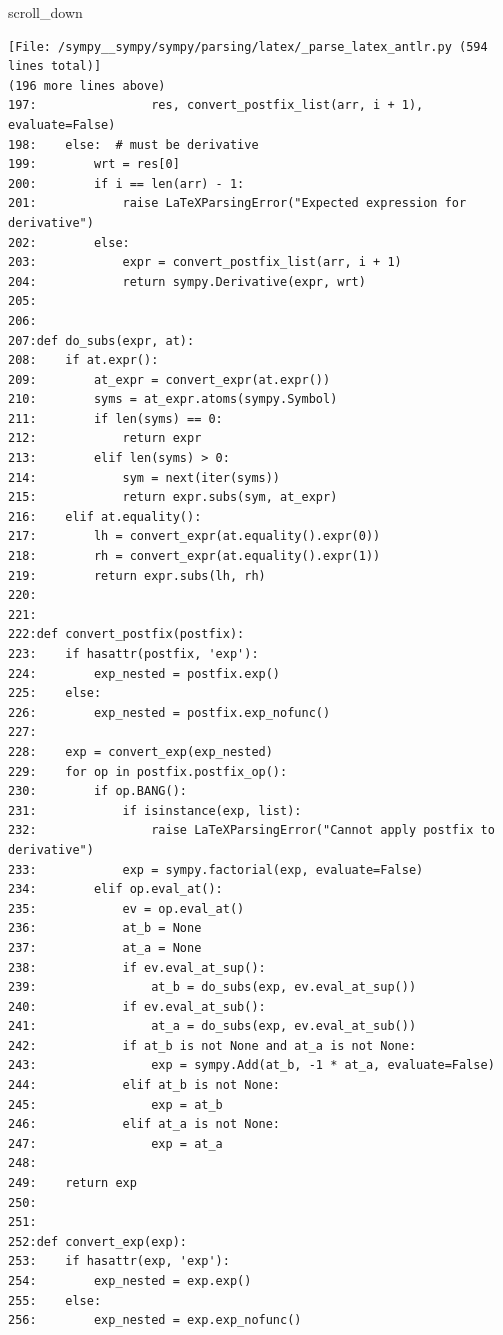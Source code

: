 {\begin{agentbox}
\hrulefill
\begin{CodeVerbatim}[breaklines=true, breakanywhere=true]
scroll_down
\end{CodeVerbatim}
\end{agentbox}
\begin{observationbox}\begin{Verbatim}[breaklines=true, breakanywhere=true]
[File: /sympy__sympy/sympy/parsing/latex/_parse_latex_antlr.py (594 lines total)]
(196 more lines above)
197:                res, convert_postfix_list(arr, i + 1), evaluate=False)
198:    else:  # must be derivative
199:        wrt = res[0]
200:        if i == len(arr) - 1:
201:            raise LaTeXParsingError("Expected expression for derivative")
202:        else:
203:            expr = convert_postfix_list(arr, i + 1)
204:            return sympy.Derivative(expr, wrt)
205:
206:
207:def do_subs(expr, at):
208:    if at.expr():
209:        at_expr = convert_expr(at.expr())
210:        syms = at_expr.atoms(sympy.Symbol)
211:        if len(syms) == 0:
212:            return expr
213:        elif len(syms) > 0:
214:            sym = next(iter(syms))
215:            return expr.subs(sym, at_expr)
216:    elif at.equality():
217:        lh = convert_expr(at.equality().expr(0))
218:        rh = convert_expr(at.equality().expr(1))
219:        return expr.subs(lh, rh)
220:
221:
222:def convert_postfix(postfix):
223:    if hasattr(postfix, 'exp'):
224:        exp_nested = postfix.exp()
225:    else:
226:        exp_nested = postfix.exp_nofunc()
227:
228:    exp = convert_exp(exp_nested)
229:    for op in postfix.postfix_op():
230:        if op.BANG():
231:            if isinstance(exp, list):
232:                raise LaTeXParsingError("Cannot apply postfix to derivative")
233:            exp = sympy.factorial(exp, evaluate=False)
234:        elif op.eval_at():
235:            ev = op.eval_at()
236:            at_b = None
237:            at_a = None
238:            if ev.eval_at_sup():
239:                at_b = do_subs(exp, ev.eval_at_sup())
240:            if ev.eval_at_sub():
241:                at_a = do_subs(exp, ev.eval_at_sub())
242:            if at_b is not None and at_a is not None:
243:                exp = sympy.Add(at_b, -1 * at_a, evaluate=False)
244:            elif at_b is not None:
245:                exp = at_b
246:            elif at_a is not None:
247:                exp = at_a
248:
249:    return exp
250:
251:
252:def convert_exp(exp):
253:    if hasattr(exp, 'exp'):
254:        exp_nested = exp.exp()
255:    else:
256:        exp_nested = exp.exp_nofunc()

\end{Verbatim}
\end{observationbox}}
